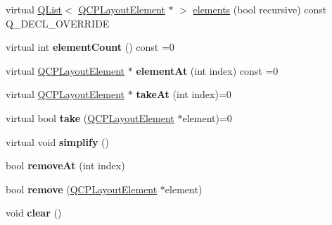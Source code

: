 \begin{DoxyCompactItemize}
\item 
virtual \hyperlink{class_q_list}{Q\+List}$<$ \hyperlink{class_q_c_p_layout_element}{Q\+C\+P\+Layout\+Element} $\ast$ $>$ \hyperlink{class_q_c_p_layout_a15d7ab417316952a13bed428819af690}{elements} (bool recursive) const Q\+\_\+\+D\+E\+C\+L\+\_\+\+O\+V\+E\+R\+R\+I\+DE
\item 
\mbox{\label{class_q_c_p_layout_acc6012e7dacc55c4282942c31c45b8d9}} 
virtual int {\bfseries element\+Count} () const =0
\item 
\mbox{\label{class_q_c_p_layout_ac0197e0bf3fabb51aafd8d9ba5a3a914}} 
virtual \hyperlink{class_q_c_p_layout_element}{Q\+C\+P\+Layout\+Element} $\ast$ {\bfseries element\+At} (int index) const =0
\item 
\mbox{\label{class_q_c_p_layout_a34a5b3bb4fa35915275cce98ebd26ba7}} 
virtual \hyperlink{class_q_c_p_layout_element}{Q\+C\+P\+Layout\+Element} $\ast$ {\bfseries take\+At} (int index)=0
\item 
\mbox{\label{class_q_c_p_layout_ad110be0de976cd8a817513a4a53d53db}} 
virtual bool {\bfseries take} (\hyperlink{class_q_c_p_layout_element}{Q\+C\+P\+Layout\+Element} $\ast$element)=0
\item 
\mbox{\label{class_q_c_p_layout_ad218c330d746a9e58b24b5817081a478}} 
virtual void {\bfseries simplify} ()
\item 
\mbox{\label{class_q_c_p_layout_a2403f684fee3ce47132faaeed00bb066}} 
bool {\bfseries remove\+At} (int index)
\item 
\mbox{\label{class_q_c_p_layout_a6c58f537d8086f352576ab7c5b15d0bc}} 
bool {\bfseries remove} (\hyperlink{class_q_c_p_layout_element}{Q\+C\+P\+Layout\+Element} $\ast$element)
\item 
\mbox{\label{class_q_c_p_layout_a02883bdf2769b5b227f0232dba1ac4ee}} 
void {\bfseries clear} ()
\end{DoxyCompactItemize}
